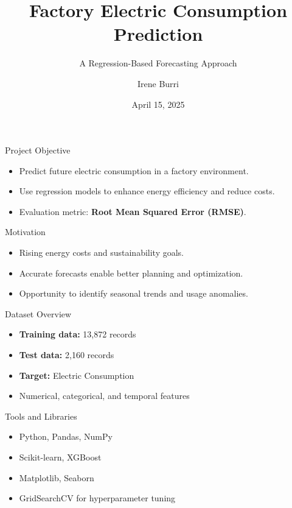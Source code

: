 \documentclass{beamer}
\title[Factory Electric Consumption Prediction]{Factory Electric Consumption Prediction}
\subtitle{A Regression-Based Forecasting Approach}
\author{Irene Burri}
\date{April 15, 2025}
\begin{document}
\begin{frame}
  \titlepage
\end{frame}

\begin{frame}{Project Objective}
  \begin{itemize}
    \item Predict future electric consumption in a factory environment.
    \item Use regression models to enhance energy efficiency and reduce costs.
    \item Evaluation metric: \textbf{Root Mean Squared Error (RMSE)}.
  \end{itemize}
\end{frame}

\begin{frame}{Motivation}
  \begin{itemize}
    \item Rising energy costs and sustainability goals.
    \item Accurate forecasts enable better planning and optimization.
    \item Opportunity to identify seasonal trends and usage anomalies.
  \end{itemize}
\end{frame}

\begin{frame}{Dataset Overview}
  \begin{itemize}
    \item \textbf{Training data:} 13,872 records
    \item \textbf{Test data:} 2,160 records
    \item \textbf{Target:} Electric Consumption
    \item Numerical, categorical, and temporal features
  \end{itemize}
\end{frame}

\begin{frame}{Tools and Libraries}
  \begin{itemize}
    \item Python, Pandas, NumPy
    \item Scikit-learn, XGBoost
    \item Matplotlib, Seaborn
    \item GridSearchCV for hyperparameter tuning
  \end{itemize}
\end{frame}
\end{document}
